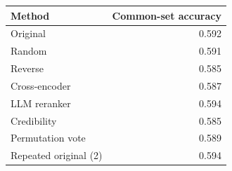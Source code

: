\begin{tabular}{lr}
\toprule
Method & Common-set accuracy \\
\midrule
Original & 0.592 \\
Random & 0.591 \\
Reverse & 0.585 \\
Cross-encoder & 0.587 \\
LLM reranker & 0.594 \\
Credibility & 0.585 \\
Permutation vote & 0.589 \\
Repeated original (2) & 0.594 \\
\bottomrule
\end{tabular}
